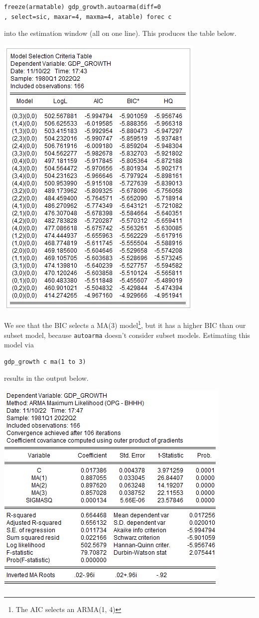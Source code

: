 \documentclass[11pt, a4paper]{article}
\begin{document}
\begin{enumerate}
\begin{enumerate}
\begin{verbatim}freeze(armatable) gdp_growth.autoarma(diff=0
, select=sic, maxar=4, maxma=4, atable) forec c
\end{verbatim}
into the estimation window (all on one line).
This produces the table below.
\begin{center}
\includegraphics[width=.6\textwidth]{autoarma}
\end{center}
We see that the BIC selects a MA(3) model\footnote{The AIC selects an ARMA(1, 4)}, but it has a higher BIC than our subset model, because \verb.autoarma. doesn't consider subset models. Estimating this model via
\begin{verbatim}
gdp_growth c ma(1 to 3)
\end{verbatim}
results in the output below.
\begin{center}
\includegraphics[width=.6\textwidth]{ma3_gdpg}

\end{center}
\end{enumerate}
\end{enumerate}
\end{document}
